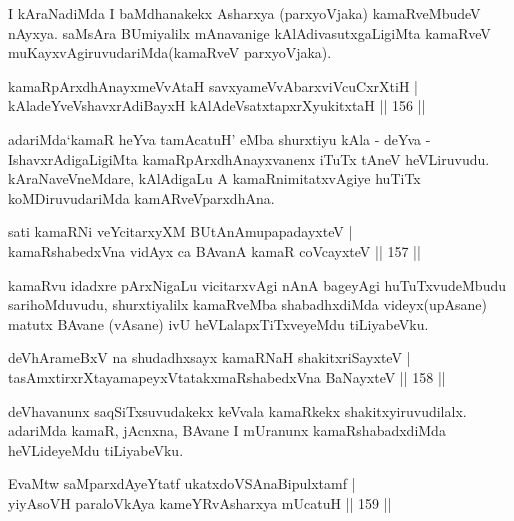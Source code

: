 \begin{artha}
I kAraNadiMda I baMdhanakekx Asharxya (parxyoVjaka) kamaRveMbudeV nAyxya. saMsAra BUmiyalilx mAnavanige kAlAdivasutxgaLigiMta kamaRveV muKayxvAgiruvudariMda(kamaRveV parxyoVjaka).
\end{artha}

\begin{shl}
kamaRpArxdhAnayxmeVvAtaH savxyameVvAbarxviVcuCxrXtiH |\\
kAladeYveVshavxrAdiBayxH kAlAdeVsatxtapxrXyukitxtaH \hfill || 156 ||
\end{shl}

\begin{artha}
adariMda`kamaR heYva tamAcatuH' eMba shurxtiyu  kAla - deYva - IshavxrAdigaLigiMta kamaRpArxdhAnayxvanenx iTuTx tAneV heVLiruvudu. kAraNaveVneMdare, kAlAdigaLu A kamaRnimitatxvAgiye huTiTx koMDiruvudariMda kamARveVparxdhAna.
\end{artha}


\begin{shl}
sati kamaRNi veYcitarxyXM BUtAnAmupapadayxteV |\\
kamaRshabedxVna vidAyx ca BAvanA kamaR coVcayxteV \hfill || 157 ||
\end{shl}

\begin{artha}
kamaRvu idadxre pArxNigaLu vicitarxvAgi nAnA bageyAgi huTuTxvudeMbudu sarihoMduvudu, shurxtiyalilx kamaRveMba shabadhxdiMda videyx(upAsane) matutx BAvane (vAsane) ivU heVLalapxTiTxveyeMdu tiLiyabeVku.
\end{artha}


\begin{shl}
deVhArameBxV na shudadhxsayx kamaRNaH shakitxriSayxteV |\\
tasAmxtirxrXtayamapeyxVtatakxmaRshabedxVna BaNayxteV \hfill || 158 ||
\end{shl}

\begin{artha}
deVhavanunx saqSiTxsuvudakekx keVvala kamaRkekx shakitxyiruvudilalx. adariMda kamaR, jAcnxna, BAvane I mUranunx kamaRshabadxdiMda heVLideyeMdu tiLiyabeVku.
\end{artha}

\begin{shl}
EvaMtw saMparxdAyeYtatf ukatxdoVSAnaBipulxtamf  | \\
 yiyAsoVH paraloVkAya kameYRvAsharxya mUcatuH \hfill|| 159 ||
\end{shl}

